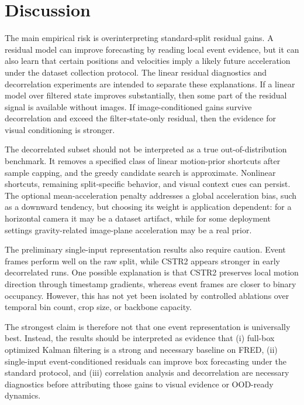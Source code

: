 \section{Discussion}

The main empirical risk is overinterpreting standard-split residual gains. A residual model can improve forecasting by reading local event evidence, but it can also learn that certain positions and velocities imply a likely future acceleration under the dataset collection protocol. The linear residual diagnostics and decorrelation experiments are intended to separate these explanations. If a linear model over filtered state improves substantially, then some part of the residual signal is available without images. If image-conditioned gains survive decorrelation and exceed the filter-state-only residual, then the evidence for visual conditioning is stronger.

The decorrelated subset should not be interpreted as a true out-of-distribution benchmark. It removes a specified class of linear motion-prior shortcuts after sample capping, and the greedy candidate search is approximate. Nonlinear shortcuts, remaining split-specific behavior, and visual context cues can persist. The optional mean-acceleration penalty addresses a global acceleration bias, such as a downward tendency, but choosing its weight is application dependent: for a horizontal camera it may be a dataset artifact, while for some deployment settings gravity-related image-plane acceleration may be a real prior.

The preliminary single-input representation results also require caution. Event frames perform well on the raw split, while CSTR2 appears stronger in early decorrelated runs. One possible explanation is that CSTR2 preserves local motion direction through timestamp gradients, whereas event frames are closer to binary occupancy. However, this has not yet been isolated by controlled ablations over temporal bin count, crop size, or backbone capacity.

The strongest claim is therefore not that one event representation is universally best. Instead, the results should be interpreted as evidence that (i) full-box optimized Kalman filtering is a strong and necessary baseline on FRED, (ii) single-input event-conditioned residuals can improve box forecasting under the standard protocol, and (iii) correlation analysis and decorrelation are necessary diagnostics before attributing those gains to visual evidence or OOD-ready dynamics.

